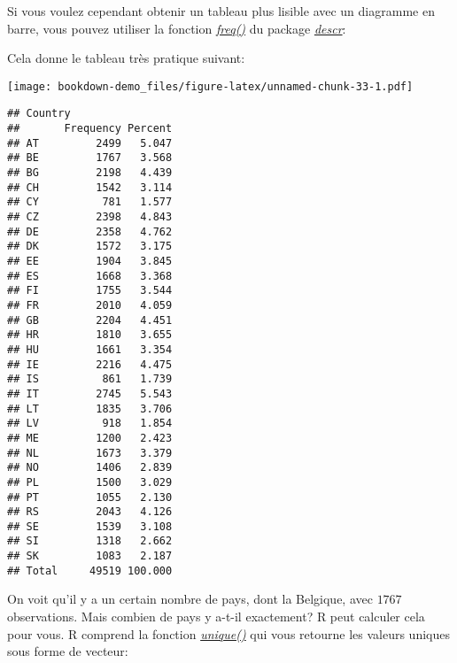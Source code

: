\documentclass[
]{book}
\newenvironment{Shaded}{\begin{snugshade}}{\end{snugshade}}
\newcommand{\FunctionTok}[1]{\textcolor[rgb]{0.00,0.00,0.00}{#1}}
\newcommand{\NormalTok}[1]{#1}
\newcommand{\SpecialCharTok}[1]{\textcolor[rgb]{0.00,0.00,0.00}{#1}}
\begin{document}
Si vous voulez cependant obtenir un tableau plus lisible avec un diagramme en barre, vous pouvez utiliser la fonction \href{https://www.rdocumentation.org/packages/descr/versions/1.1.5/topics/freq}{\emph{freq()}} du package \href{https://cran.r-project.org/web/packages/descr/index.html}{\emph{descr}}:

\begin{Shaded}
\end{Shaded}

Cela donne le tableau très pratique suivant:

\texttt{[image: bookdown-demo\_files/figure-latex/unnamed-chunk-33-1.pdf]}

\begin{verbatim}
## Country 
##       Frequency Percent
## AT         2499   5.047
## BE         1767   3.568
## BG         2198   4.439
## CH         1542   3.114
## CY          781   1.577
## CZ         2398   4.843
## DE         2358   4.762
## DK         1572   3.175
## EE         1904   3.845
## ES         1668   3.368
## FI         1755   3.544
## FR         2010   4.059
## GB         2204   4.451
## HR         1810   3.655
## HU         1661   3.354
## IE         2216   4.475
## IS          861   1.739
## IT         2745   5.543
## LT         1835   3.706
## LV          918   1.854
## ME         1200   2.423
## NL         1673   3.379
## NO         1406   2.839
## PL         1500   3.029
## PT         1055   2.130
## RS         2043   4.126
## SE         1539   3.108
## SI         1318   2.662
## SK         1083   2.187
## Total     49519 100.000
\end{verbatim}

On voit qu'il y a un certain nombre de pays, dont la Belgique, avec \(1767\) observations. Mais combien de pays y a-t-il exactement? R peut calculer cela pour vous. R comprend la fonction \href{https://www.rdocumentation.org/packages/base/versions/3.6.2/topics/unique}{\emph{unique()}} qui vous retourne les valeurs uniques sous forme de vecteur:

\begin{Shaded}
\end{Shaded}
\end{document}
